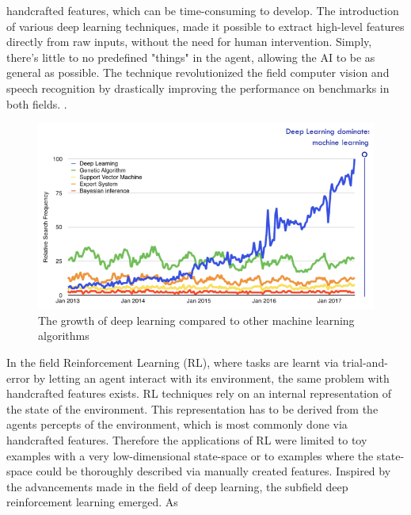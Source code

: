         handcrafted features, which can be time-consuming to develop. The introduction of various deep learning techniques, made it possible to extract high-level features directly from raw inputs, without the need
        for human intervention. Simply, there's little to no predefined "things" in the agent, allowing the AI to be as general as possible. The technique revolutionized the field computer vision and speech recognition
        by drastically improving the performance on benchmarks in both fields. \cite{Krizhevsky:2012:ICD:2999134.2999257}\cite{DBLP:journals/corr/abs-1303-5778}.
                 \begin{figure}[H]
            \centering
            \includegraphics[scale=0.5]{images/deep-learning.png}
            \caption[The growth of deep learning compared to other machine learning algorithms]{The growth of deep learning compared to other machine learning algorithms \cite{leepdearning}}
            \label{fig:11}
        \end{figure}
        \par
        \par
        In the field Reinforcement Learning (RL), where tasks are learnt via trial-and-error by letting an agent
        interact with its environment, the same problem with handcrafted features exists. RL techniques rely on
        an internal representation of the state of the environment. This representation has to be derived from the
        agents percepts of the environment, which is most commonly done via handcrafted features. Therefore
        the applications of RL were limited to toy examples with a very low-dimensional state-space or to examples where the state-space could be thoroughly described via manually created features. Inspired by the
        advancements made in the field of deep learning, the subfield deep reinforcement learning emerged. As
